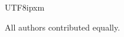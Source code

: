 \documentclass[linenumbers,trackchanges]{aastex701}
\begin{document}
\begin{CJK*}{UTF8}{ipxm}
\begin{contribution}
All authors contributed equally.


\end{contribution}

%



\end{CJK*}
\end{document}
